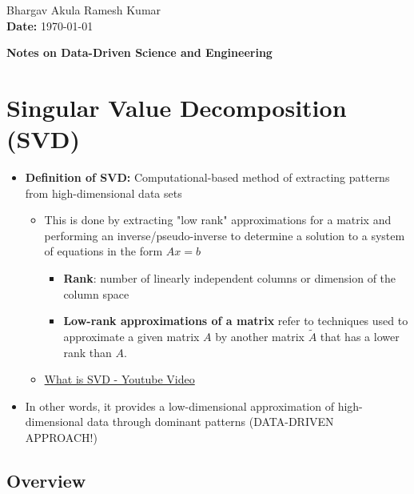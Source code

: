 \documentclass[11.5pt,a4paper]{article}
\begin{document}
 

\noindent  Bhargav Akula Ramesh Kumar\\
\textbf{Date: } \today
\begin{center}
    \textbf{Notes on Data-Driven Science and Engineering}
\end{center}

\section{Singular Value Decomposition (SVD)}

\begin{itemize}
    \item \textbf{Definition of SVD:} Computational-based method of extracting patterns from high-dimensional data sets
    \begin{itemize}
        \item This is done by extracting "low rank" approximations for a matrix and performing an inverse/pseudo-inverse to determine a solution to a system of equations in the form $Ax = b$
        \begin{itemize}
            \item \textbf{Rank}: number of linearly independent columns or dimension of the column space
            \item \textbf{Low-rank approximations of a matrix} refer to techniques used to approximate a given matrix \( A \) by another matrix \( \tilde{A} \) that has a lower rank than \( A \).
        \end{itemize}
        \item \href{https://www.youtube.com/watch?v=CpD9XlTu3ys}{What is SVD - Youtube Video}
    \end{itemize}
    \item In other words, it provides a low-dimensional approximation of high-dimensional data through dominant patterns (DATA-DRIVEN APPROACH!)
\end{itemize}

\subsection*{Overview}
\end{document}
